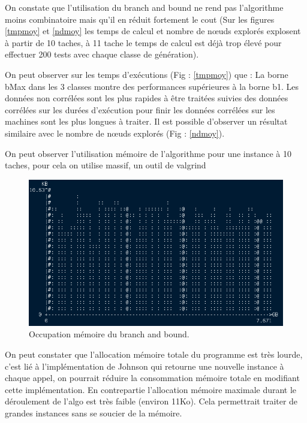 \documentclass[12pt]{article}
\begin{document}
On constate que l'utilisation du branch and bound ne rend pas l'algorithme moins combinatoire mais qu'il en réduit fortement le cout (Sur les figures \ref{tmpmoy} et \ref{ndmoy} les temps de calcul et nombre de nœuds explorés explosent à partir de 10 taches, à 11 tache le temps de calcul est déjà trop élevé pour effectuer 200 tests avec chaque classe de génération).


On peut observer sur les temps d'exécutions (Fig : \ref{tmpmoy}) que :
La borne bMax dans les 3 classes montre des performances supérieures à la borne b1.
Les données non corrélées sont les plus rapides à être traitées suivies des données corrélées sur les durées d'exécution pour finir les données corrélées sur les machines sont les plus longues à traiter. Il est possible d'observer un résultat similaire avec le nombre de nœuds explorés (Fig : \ref{ndmoy}).

On peut observer l'utilisation mémoire de l'algorithme pour une instance à 10 taches, pour cela on utilise massif, un outil de valgrind

\begin{figure}[!ht]
\centering
\centerline{\includegraphics[scale=0.6]{mem.png}}
\caption{Occupation mémoire du branch and bound.}
\label{mem}
\end{figure}

On peut constater que l'allocation mémoire totale du programme est très lourde, c'est lié à l'implémentation de Johnson qui retourne une nouvelle instance à chaque appel, on pourrait réduire la consommation mémoire totale en modifiant cette implémentation. En contrepartie l'allocation mémoire maximale durant le déroulement de l'algo est très faible (environ 11Ko). Cela permettrait traiter de grandes instances sans se soucier de la mémoire.

\end{document}
